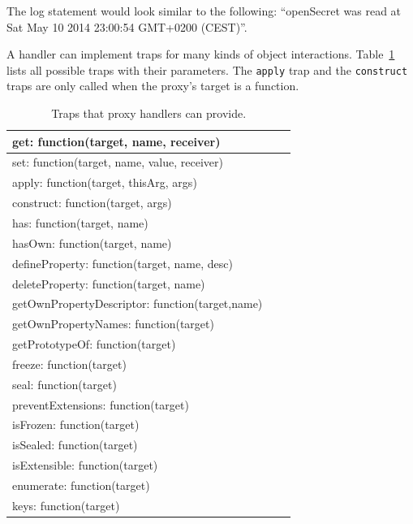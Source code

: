 The log statement would look similar to the following: ``openSecret was read at Sat May 10 2014 23:00:54 GMT+0200 (CEST)''.

A handler can implement traps for many kinds of object interactions.
Table~\ref{table:traps} lists all possible traps with their parameters.
The \lstinline{apply} trap and the \lstinline{construct} traps are only called when the proxy's target is a function.

\begin{table}[h]
\begin{center}
\begin{tabular}{|l|l|r|}
\hline
get: function(target, name, receiver) \\ \hline
set: function(target, name, value, receiver) \\ \hline
apply: function(target, thisArg, args) \\ \hline
construct: function(target, args) \\ \hline
has: function(target, name) \\ \hline
hasOwn: function(target, name) \\ \hline
defineProperty: function(target, name, desc) \\ \hline
deleteProperty: function(target, name) \\ \hline
getOwnPropertyDescriptor: function(target,name) \\ \hline
getOwnPropertyNames: function(target) \\ \hline
getPrototypeOf: function(target) \\ \hline
freeze: function(target) \\ \hline
seal: function(target) \\ \hline
preventExtensions: function(target) \\ \hline
isFrozen: function(target) \\ \hline
isSealed: function(target) \\ \hline
isExtensible: function(target) \\ \hline
enumerate: function(target) \\ \hline
keys: function(target) \\ \hline
\end{tabular}
\caption[Table caption text]{Traps that proxy handlers can provide.}
\label{table:traps}
\end{center}
\end{table}

